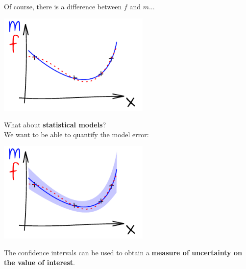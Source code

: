 \documentclass{beamer}
\begin{document}
\begin{frame}{}
Of course, there is a difference between $f$ and $m$...
\begin{center}
\includegraphics[height=5cm]{figures/ink_mf}
\end{center}
\end{frame}

\begin{frame}{}
What about \textbf{statistical models}? \\We want to be able to quantify the model error:
\begin{center}
\includegraphics[height=5cm]{figures/ink_mconfint}
\end{center}
The confidence intervals can be used to obtain a \textbf{measure of uncertainty on the value of interest}.
\end{frame}
\end{document}
